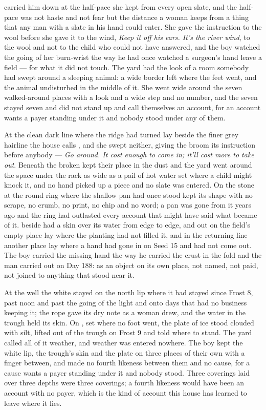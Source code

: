  carried him down at the half-pace she kept from every open slate, and the half-pace was not haste and not fear but the distance a woman keeps from a thing that any man with a slate in his hand could enter. She gave the instruction to the wool before she gave it to the wind, \emph{Keep it off his ears. It's the river wind}, to the wool and not to the child who could not have answered, and the boy watched the going of her burn-wrist the way he had once watched a surgeon's hand leave a field --- for what it did not touch. The yard had the look of a room somebody had swept around a sleeping animal: a wide border left where the feet went, and the animal undisturbed in the middle of it. She went wide around the seven walked-around places with a look and a wide step and no number, and the seven stayed seven and did not stand up and call themselves an account, for an account wants a payer standing under it and nobody stood under any of them.

At  the clean dark line where the  ridge had turned lay beside the finer grey hairline the house calls , and she swept neither, giving the broom its instruction before anybody --- \emph{Go around. It cost enough to come in; it'll cost more to take out}. Beneath  the broken  kept their place in the dust and the yard went around the space under the rack as wide as a pail of hot water set where a child might knock it, and no hand picked up a piece and no slate was entered. On the stone at  the round ring where the shallow pan had once stood kept its shape with no scrape, no crumb, no print, no chip and no word; a pan was gone from it years ago and the ring had outlasted every account that might have said what became of it.  beside  had a skin over its water from edge to edge, and out on  the field's empty place lay where the planting had not filled it, and in the returning line another place lay where a hand had gone in on Seed 15 and had not come out. The boy carried the missing hand the way he carried the crust in the fold and the man carried out on Day 188: as an object on its own place, not named, not paid, not joined to anything that stood near it.

At the well the white  stayed on the north lip where it had stayed since Frost 8, past noon and past the going of the light and onto days that had no business keeping it; the rope gave its dry note as a woman drew, and the water in the trough held its skin. On , set where no foot went, the plate of ice stood clouded with silt, lifted out of the trough on Frost 9 and told where to stand. The yard called all of it weather, and weather was entered nowhere. The boy kept the white lip, the trough's skin and the plate on three places of their own with a finger between, and made no fourth likeness between them and no cause, for a cause wants a payer standing under it and nobody stood. Three coverings laid over three depths were three coverings; a fourth likeness would have been an account with no payer, which is the kind of account this house has learned to leave where it lies.

